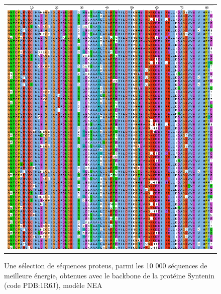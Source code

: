    \begin{figure}[t]
     \centering
     \begin{tabular}{c}
       \includegraphics[width=17cm]{proteus/1R6J.png} \\
     \end{tabular}
       \caption{Une sélection de séquences proteus, parmi les 10 000 séquences de meilleure énergie, obtenues avec le backbone de la protéine Syntenin (code PDB:1R6J), modèle NEA}
\label{align_proteus:Syntenin}
   \end{figure}
\clearpage

